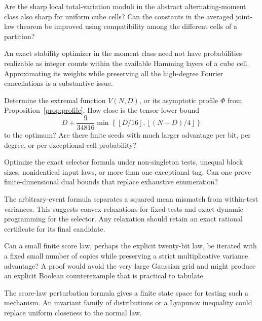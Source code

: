 \begin{question}
Are the sharp local total-variation moduli in the abstract
alternating-moment class also sharp for uniform cube cells?
Can the constants in the averaged joint-law theorem be improved
using compatibility among the different cells of a partition?
\end{question}

An exact stability optimizer in the moment class need not have
probabilities realizable as integer counts within the available
Hamming layers of a cube cell.
Approximating its weights while preserving all the high-degree
Fourier cancellations is a substantive issue.

\begin{question}
Determine the extremal function \(V(N,D)\), or its asymptotic
profile \(\Phi\) from Proposition~\ref{prop:profile}.
How close is the tensor lower bound
\[
 D+\frac9{34816}
 \min\left\{\left\lfloor D/16\right\rfloor,
             \left\lfloor(N-D)/4\right\rfloor\right\}
\]
to the optimum? Are there finite seeds with much larger advantage
per bit, per degree, or per exceptional-cell probability?
\end{question}

\begin{question}
Optimize the exact selector formula under non-singleton tests,
unequal block sizes, nonidentical input laws, or more than one
exceptional tag. Can one prove finite-dimensional dual bounds
that replace exhaustive enumeration?
\end{question}

The arbitrary-event formula separates a squared mean mismatch from
within-test variances. This suggests convex relaxations for fixed
tests and exact dynamic programming for the selector. Any relaxation
should retain an exact rational certificate for its final candidate.

\begin{question}
Can a small finite score law, perhaps the explicit twenty-bit law,
be iterated with a fixed small number of copies while preserving a
strict multiplicative variance advantage? A proof would avoid the
very large Gaussian grid and might produce an explicit Boolean
counterexample that is practical to tabulate.
\end{question}

The score-law perturbation formula gives a finite state space for
testing such a mechanism. An invariant family of distributions or a
Lyapunov inequality could replace uniform closeness to the normal law.

